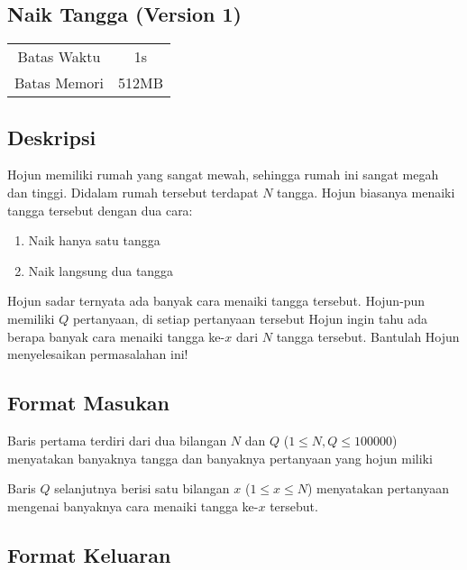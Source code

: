 \documentclass{article}
\begin{document}
\begin{center}
    \section*{Naik Tangga (Version 1)} %

    \begin{tabular}{ | c c | }
        \hline
        Batas Waktu  & 1s \\    %
        Batas Memori & 512MB \\  %
        \hline
    \end{tabular}
\end{center}

\subsection*{Deskripsi}

Hojun memiliki rumah yang sangat mewah, sehingga rumah ini sangat megah dan tinggi. Didalam rumah tersebut terdapat $N$ tangga. Hojun biasanya menaiki tangga tersebut dengan dua cara:
\vspace{-\baselineskip}
\begin{enumerate}
    \setlength\itemsep{0pt}
    \item Naik hanya satu tangga
    \item Naik langsung dua tangga
\end{enumerate}
\vspace{-\baselineskip}
Hojun sadar ternyata ada banyak cara menaiki tangga tersebut. Hojun-pun memiliki $Q$ pertanyaan, di setiap pertanyaan tersebut Hojun ingin tahu ada berapa banyak cara menaiki tangga ke-$x$ dari $N$ tangga tersebut. Bantulah Hojun menyelesaikan permasalahan ini!

\subsection*{Format Masukan}

Baris pertama terdiri dari dua bilangan $N$ dan $Q$ ($1 \leq N, Q \leq 100000$) menyatakan banyaknya tangga dan banyaknya pertanyaan yang hojun miliki

Baris $Q$ selanjutnya berisi satu bilangan $x$ ($1 \leq x \leq N$) menyatakan pertanyaan mengenai banyaknya cara menaiki tangga ke-$x$ tersebut.

\subsection*{Format Keluaran}
\end{document}
